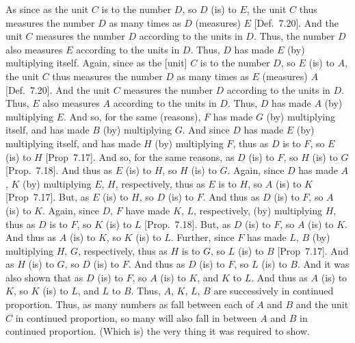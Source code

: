 \begin{Parallel}{}{}
{As since as the unit $C$  is to the number $D$, so $D$ (is) to $E$, the unit
$C$ thus measures the number $D$ as many times as $D$ (measures) $E$
[Def.~7.20]. And the unit $C$ measures the
number $D$ according to the units in $D$. Thus, the number $D$
also measures $E$ according to the units in $D$. Thus, $D$ has made $E$
(by) multiplying itself. Again, since as the [unit] $C$ is to
the number $D$, so $E$ (is) to $A$, the unit $C$ thus measures the number
$D$ as many times as $E$ (measures) $A$ [Def.~7.20].
  And the unit $C$ measures the number $D$ according to the units in $D$.
  Thus, $E$ also measures $A$ according to the units  in $D$. Thus, $D$
  has made $A$ (by) multiplying $E$. And so, for the same (reasons), 
  $F$ has made $G$ (by) multiplying itself, and has made $B$ (by)
  multiplying $G$. And since $D$ has made $E$ (by) multiplying itself,
  and has made $H$ (by) multiplying $F$, thus as $D$ is to $F$, so
  $E$ (is) to $H$ [Prop~7.17]. And so, for the
  same reasons, as $D$ (is) to $F$, so $H$ (is) to $G$ [Prop.~7.18].  And thus as $E$ (is) to $H$, so $H$
  (is) to $G$. Again, since $D$ has made  $A$, $K$ (by)
  multiplying $E$, $H$, respectively, thus as $E$ is to $H$, so $A$ (is)
  to $K$ [Prop~7.17]. But, as $E$ (is) to $H$,
  so $D$ (is) to $F$. And thus as $D$ (is) to $F$, so $A$ (is) to $K$.
  Again, since  $D$, $F$ have made  $K$, $L$, respectively, (by) multiplying $H$, thus as $D$ is to $F$, so $K$ (is) to $L$ [Prop.~7.18]. But, as $D$ (is) to $F$, so $A$ (is)
  to $K$.  And thus as $A$ (is) to $K$, so $K$ (is) to $L$.
   Further, since $F$ has made  $L$, $B$ (by) multiplying
   $H$, $G$, respectively, thus as $H$ is to $G$, so $L$ (is) to $B$  [Prop~7.17]. And as $H$ (is) to $G$, so $D$ (is) to $F$. And thus as $D$ 
  (is) to $F$, so $L$ (is) to $B$. And it was also
  shown that as $D$ (is) to $F$, so $A$ (is) to $K$, and $K$ to $L$.
  And thus as $A$ (is) to $K$, so $K$ (is) to $L$, and $L$ to $B$.
  Thus, $A$, $K$, $L$, $B$ are  successively in continued proportion.
  Thus, as many numbers as fall between each of $A$ and $B$ and the unit $C$ in continued proportion, so many will also fall in between $A$ and $B$
  in continued proportion. (Which is) the very thing it was required to show.}
\end{Parallel}

